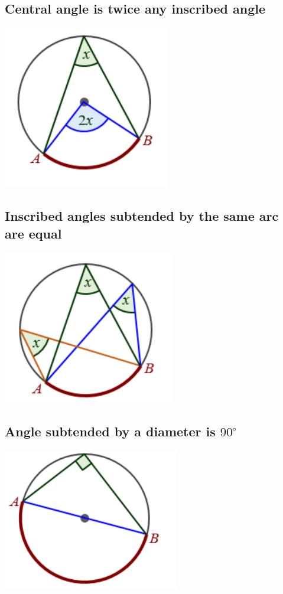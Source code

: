 \documentclass{article}
\begin{document}
\subsection{Central angle is twice any inscribed angle}
\includegraphics{Picture2.png}

\pagebreak

\subsection{Inscribed angles subtended by the same arc are equal}

\includegraphics{Picture3.png}

\vspace{40px}

\subsection{Angle subtended by a diameter is \(90^{\circ}\)}

\includegraphics{Picture4.png}
\end{document}
